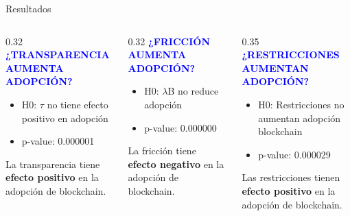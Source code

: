 \documentclass{beamer}
\begin{document}
\begin{frame}{Resultados}
  
  \begin{columns}[T]
    
    \begin{column}{0.32\textwidth}
      \centering
      \textcolor{blue}{\textbf{¿TRANSPARENCIA AUMENTA ADOPCIÓN?}}
      
      \vspace{0.5em}
      
      \begin{itemize}
        \item H0: $\tau$ no tiene efecto positivo en adopción
        \item p-value: 0.000001
      \end{itemize}
      
      \vspace{1em}
      
      La transparencia tiene \textbf{efecto positivo} en la adopción de blockchain.
    \end{column}
    
    \begin{column}{0.32\textwidth}
      \centering
      \textcolor{blue}{\textbf{¿FRICCIÓN AUMENTA ADOPCIÓN?}}
      
      \vspace{0.5em}
      
      \begin{itemize}
        \item H0: $\lambda$B no reduce adopción
        \item p-value: 0.000000
      \end{itemize}
      
      \vspace{1em}
      
      La fricción tiene \textbf{efecto negativo} en la adopción de blockchain.
    \end{column}
    
    \begin{column}{0.35\textwidth}
      \centering
      \textcolor{blue}{\textbf{¿RESTRICCIONES AUMENTAN ADOPCIÓN?}}
      
      \vspace{0.5em}
      
      \begin{itemize}
        \item H0: Restricciones no aumentan adopción blockchain 
        \item p-value: 0.000029
      \end{itemize}
      
      \vspace{1em}
      
      Las restricciones tienen \textbf{efecto positivo} en la adopción de blockchain.
    \end{column}
    
  \end{columns}
  
\end{frame}
\end{document}
